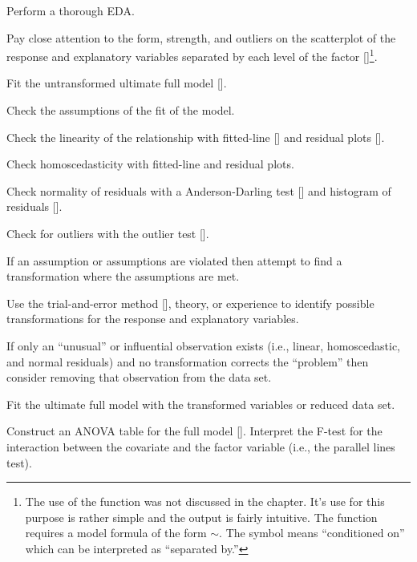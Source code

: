 \documentclass[10pt,openany]{book}\usepackage[]{graphicx}\usepackage[]{color}
\begin{document}
\begin{Enumerate}
  \item Perform a thorough EDA.
    \begin{Itemize}
      \item Pay close attention to the form, strength, and outliers on the scatterplot of the response and explanatory variables separated by each level of the factor []\footnote{The use of the  function was not discussed in the chapter.  It's use for this purpose is rather simple and the output is fairly intuitive.  The  function requires a model formula of the form $\sim$.  The \R{|} symbol means ``conditioned on'' which can be interpreted as ``separated by.''}.
    \end{Itemize}
  \item Fit the untransformed ultimate full model [].
  \item Check the assumptions of the fit of the model.
    \begin{Itemize}
      \item Check the linearity of the relationship with fitted-line [] and residual plots [].
      \item Check homoscedasticity with fitted-line and residual plots.
      \item Check normality of residuals with a Anderson-Darling test [] and histogram of residuals [].
      \item Check for outliers with the outlier test [].
    \end{Itemize}
  \item If an assumption or assumptions are violated then attempt to find a transformation where the assumptions are met.
    \begin{Itemize}
      \item Use the trial-and-error method [], theory, or experience to identify possible transformations for the response and explanatory variables.
      \item If only an ``unusual'' or influential observation exists (i.e., linear, homoscedastic, and normal residuals) and no transformation corrects the ``problem'' then consider removing that observation from the data set.
      \item Fit the ultimate full model with the transformed variables or reduced data set.
    \end{Itemize}
  \item Construct an ANOVA table for the full model [].  Interpret the F-test for the interaction between the covariate and the factor variable (i.e., the parallel lines test).

\end{Enumerate}
\end{document}
